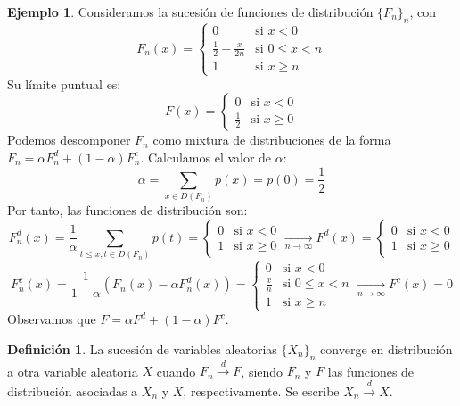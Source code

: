 \documentclass{report}
\theoremstyle{remark}
\theoremstyle{remark}
\theoremstyle{remark}
\theoremstyle{definition}
\newtheorem{definition}{Definición}[chapter]
\theoremstyle{definition}
\theoremstyle{definition}
\newtheorem*{example}{Ejemplo}
\theoremstyle{definition}
\begin{document}
\begin{example}
    Consideramos la sucesión de funciones de distribución $\{F_n\}_n$, con
    $$F_n(x) = \begin{cases}
            0                          & \text{si } x < 0        \\
            \frac{1}{2} + \frac{x}{2n} & \text{si } 0 \leq x < n \\
            1                          & \text{si } x \geq n
        \end{cases}$$
    Su límite puntual es:
    $$F(x) = \begin{cases}
            0           & \text{si } x < 0    \\
            \frac{1}{2} & \text{si } x \geq 0
        \end{cases}$$
    Podemos descomponer $F_n$ como mixtura de distribuciones de la forma $F_n = \alpha F_n^d + (1-\alpha)F_n^c$.
    Calculamos el valor de $\alpha$:
    $$\alpha = \sum_{x \in D(F_n)} p(x) = p(0) = \frac{1}{2}$$
    Por tanto, las funciones de distribución son:
    $$F_n^d(x) = \frac{1}{\alpha} \sum_{t \leq x, t \in D(F_n)} p(t) = \begin{cases}
            0 & \text{si } x < 0    \\
            1 & \text{si } x \geq 0
        \end{cases} \xrightarrow[n \to \infty]{}
        F^d(x) = \begin{cases}
            0 & \text{si } x < 0    \\
            1 & \text{si } x \geq 0
        \end{cases}$$
    $$F_n^c(x) = \frac{1}{1-\alpha}(F_n(x) - \alpha F_n^d(x)) = \begin{cases}
            0           & \text{si } x < 0        \\
            \frac{x}{n} & \text{si } 0 \leq x < n \\
            1           & \text{si } x \geq n
        \end{cases} \xrightarrow[n \to \infty]{}
        F^c(x) = 0$$
    Observamos que $F = \alpha F^d + (1-\alpha)F^c$.
\end{example}

\begin{definition}
    La sucesión de variables aleatorias $\{X_n\}_n$ converge en distribución a otra variable aleatoria $X$ cuando $F_n \xrightarrow{d} F$, siendo $F_n$ y $F$ las funciones de distribución asociadas a $X_n$ y $X$, respectivamente.
    Se escribe $X_n \xrightarrow{d} X$.
\end{definition}
\end{document}
